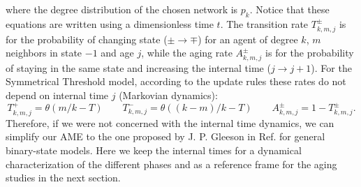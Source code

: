 	where the degree distribution of the chosen network is $p_k$. Notice that these equations are written using a dimensionless time $t$. The transition rate $T^{\pm}_{k,m,j}$ is for the probability of changing state ($\pm \to \mp$) for an agent of degree $k$, $m$ neighbors in state $-1$ and age $j$, while the aging rate $A^{\pm}_{k,m,j}$ is for the probability of staying in the same state and increasing the internal time ($j \to j + 1$). For the Symmetrical Threshold model, according to the update rules these rates do not depend on internal time $j$ (Markovian dynamics):
\begin{equation}
	T^{+}_{k,m,j} = \theta(m/k - T) \quad \quad T^{-}_{k,m,j} = \theta((k-m)/k - T) \quad \quad A^{\pm}_{k,m,j} = 1 - T^{\pm}_{k,m,j}.
\end{equation}
Therefore, if we were not concerned with the internal time dynamics, we can simplify our AME to the one proposed by J. P. Gleeson in Ref. \cite{gleeson-2013} for general binary-state models. Here we keep the internal times for a dynamical characterization of the different phases and as a reference frame for the aging studies in the next section. 

